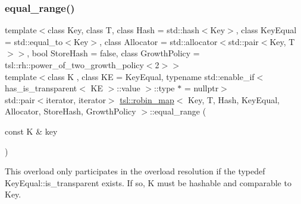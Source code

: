 \subsubsection{\texorpdfstring{equal\_range()}{equal\_range()}\hspace{0.1cm}{\footnotesize\ttfamily [3/6]}}
{\footnotesize\ttfamily template$<$class Key, class T, class Hash = std\+::hash$<$\+Key$>$, class Key\+Equal = std\+::equal\+\_\+to$<$\+Key$>$, class Allocator = std\+::allocator$<$std\+::pair$<$\+Key, T$>$$>$, bool Store\+Hash = false, class Growth\+Policy = tsl\+::rh\+::power\+\_\+of\+\_\+two\+\_\+growth\+\_\+policy$<$2$>$$>$ \\
template$<$class K , class KE  = Key\+Equal, typename std\+::enable\+\_\+if$<$ has\+\_\+is\+\_\+transparent$<$ K\+E $>$\+::value $>$\+::type $\ast$  = nullptr$>$ \\
std\+::pair$<$iterator, iterator$>$ \mbox{\hyperlink{classtsl_1_1robin__map}{tsl\+::robin\+\_\+map}}$<$ Key, T, Hash, Key\+Equal, Allocator, Store\+Hash, Growth\+Policy $>$\+::equal\+\_\+range (\begin{DoxyParamCaption}\item[{const K \&}]{key }\end{DoxyParamCaption})\hspace{0.3cm}{\ttfamily [inline]}}

This overload only participates in the overload resolution if the typedef Key\+Equal\+::is\+\_\+transparent exists. If so, K must be hashable and comparable to Key. \mbox{\label{classtsl_1_1robin__map_ac6bf6f34c1547cc8d7ec9c503c8cd748}} 
